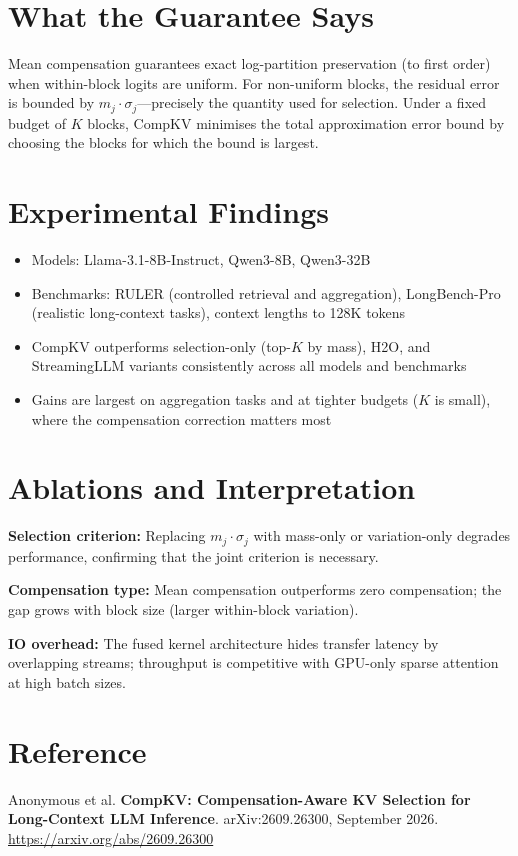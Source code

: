 \documentclass[10pt,twocolumn]{article}
\begin{document}
\section{What the Guarantee Says}

Mean compensation guarantees exact log-partition preservation (to first order)
when within-block logits are uniform. For non-uniform blocks, the residual
error is bounded by $m_j \cdot \sigma_j$---precisely the quantity used for
selection. Under a fixed budget of $K$ blocks, CompKV minimises the total
approximation error bound by choosing the blocks for which the bound is largest.

\section{Experimental Findings}

\begin{itemize}[itemsep=2pt,parsep=0pt]
  \item Models: Llama-3.1-8B-Instruct, Qwen3-8B, Qwen3-32B
  \item Benchmarks: RULER (controlled retrieval and aggregation), LongBench-Pro
    (realistic long-context tasks), context lengths to 128K tokens
  \item CompKV outperforms selection-only (top-$K$ by mass), H2O, and
    StreamingLLM variants consistently across all models and benchmarks
  \item Gains are largest on aggregation tasks and at tighter budgets ($K$
    is small), where the compensation correction matters most
\end{itemize}

\section{Ablations and Interpretation}

\textbf{Selection criterion:} Replacing $m_j \cdot \sigma_j$ with mass-only
or variation-only degrades performance, confirming that the joint criterion is
necessary.

\textbf{Compensation type:} Mean compensation outperforms zero compensation;
the gap grows with block size (larger within-block variation).

\textbf{IO overhead:} The fused kernel architecture hides transfer latency by
overlapping streams; throughput is competitive with GPU-only sparse attention
at high batch sizes.

\section*{Reference}

Anonymous et al.
\textbf{CompKV: Compensation-Aware KV Selection for Long-Context LLM Inference}.
arXiv:2609.26300, September 2026.\\
\url{https://arxiv.org/abs/2609.26300}
\end{document}

